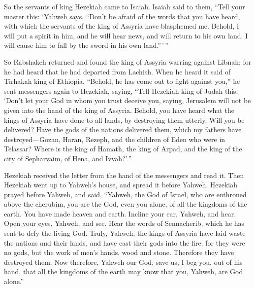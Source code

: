  So the servants of king Hezekiah came to Isaiah.
 Isaiah said to them, ``Tell your master this: `Yahweh says,
``Don't be afraid of the words that you have heard, with which the
servants of the king of Assyria have blasphemed me.  Behold,
I will put a spirit in him, and he will hear news, and will return to
his own land. I will cause him to fall by the sword in his own
land.''\,'\,''

 So Rabshakeh returned and found the king of Assyria warring
against Libnah; for he had heard that he had departed from Lachish.
 When he heard it said of Tirhakah king of Ethiopia,
``Behold, he has come out to fight against you,'' he sent messengers
again to Hezekiah, saying,  ``Tell Hezekiah king of Judah
this: `Don't let your God in whom you trust deceive you, saying,
Jerusalem will not be given into the hand of the king of Assyria.
 Behold, you have heard what the kings of Assyria have done
to all lands, by destroying them utterly. Will you be delivered?
 Have the gods of the nations delivered them, which my
fathers have destroyed---Gozan, Haran, Rezeph, and the children of Eden
who were in Telassar?  Where is the king of Hamath, the
king of Arpad, and the king of the city of Sepharvaim, of Hena, and
Ivvah?'\,''

 Hezekiah received the letter from the hand of the
messengers and read it. Then Hezekiah went up to Yahweh's house, and
spread it before Yahweh.  Hezekiah prayed before Yahweh,
and said, ``Yahweh, the God of Israel, who are enthroned above the
cherubim, you are the God, even you alone, of all the kingdoms of the
earth. You have made heaven and earth.  Incline your ear,
Yahweh, and hear. Open your eyes, Yahweh, and see. Hear the words of
Sennacherib, which he has sent to defy the living God. 
Truly, Yahweh, the kings of Assyria have laid waste the nations and
their lands,  and have cast their gods into the fire; for
they were no gods, but the work of men's hands, wood and stone.
Therefore they have destroyed them.  Now therefore, Yahweh
our God, save us, I beg you, out of his hand, that all the kingdoms of
the earth may know that you, Yahweh, are God alone.''

